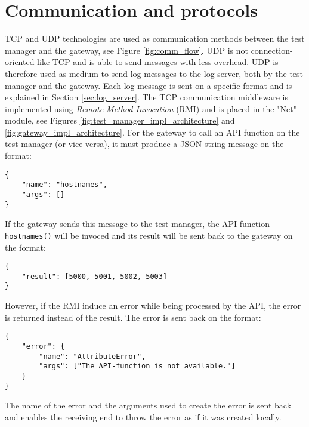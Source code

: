 \section{Communication and protocols}

TCP and UDP technologies are used as communication methods between the test
manager and the gateway, see Figure \ref{fig:comm_flow}. UDP is not
connection-oriented like TCP and is able to send messages with less overhead.
UDP is therefore used as medium to send log messages to the log server, both by
the test manager and the gateway. Each log message is sent on a specific format
and is explained in Section \ref{sec:log_server}. The TCP communication
middleware is implemented using \textit{Remote Method Invocation} (RMI)
\cite{coulouris2005distributed} and is placed in the "Net"-module, see Figures
\ref{fig:test_manager_impl_architecture} and
\ref{fig:gateway_impl_architecture}. For the gateway to call an API function on
the test manager (or vice versa), it must produce a JSON-string message on the
format:

\begin{lstlisting}
{
    "name": "hostnames",
    "args": []
}
\end{lstlisting}

If the gateway sends this message to the test manager, the API function
\texttt{hostnames()} will be invoced and its result will be sent back to the
gateway on the format:

\begin{lstlisting}
{
    "result": [5000, 5001, 5002, 5003]
}
\end{lstlisting}

However, if the RMI induce an error while being processed by the API, the error
is returned instead of the result. The error is sent back on the format:

\begin{lstlisting}
{
    "error": {
        "name": "AttributeError",
        "args": ["The API-function is not available."]
    }
}
\end{lstlisting}

The name of the error and the arguments used to create the error is sent back
and enables the receiving end to throw the error as if it was created locally.

